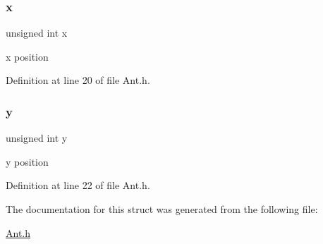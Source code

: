 \subsubsection{\texorpdfstring{x}{x}}
{\footnotesize\ttfamily unsigned int x}

x position 

Definition at line 20 of file Ant.\+h.

\mbox{\label{struct_ant_ac30de26db5f6d1c18c63913729adca7d}} 
\subsubsection{\texorpdfstring{y}{y}}
{\footnotesize\ttfamily unsigned int y}

y position 

Definition at line 22 of file Ant.\+h.



The documentation for this struct was generated from the following file\+:\begin{DoxyCompactItemize}
\item 
\mbox{\hyperlink{_ant_8h}{Ant.\+h}}\end{DoxyCompactItemize}
